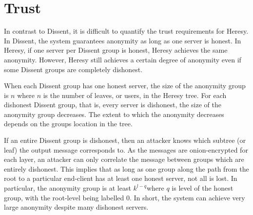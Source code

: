 \section{Trust}

In contrast to Dissent, it is difficult to quantify the trust requirements for Heresy. In Dissent, the system guarantees anonymity as long as one server is honest. In Heresy, if one server per Dissent group is honest, Heresy achieves the same anonymity. However, Heresy still achieves a certain degree of anonymity even if some Dissent groups are completely dishonest.

When each Dissent group has one honest server, the size of the anonymity group is $n$ where $n$ is the number of leaves, or users, in the Heresy tree. For each dishonest Dissent group, that is, every server is dishonest, the size of the anonymity group decreases. The extent to which the anonymity decreases depends on the groups location in the tree. 

If an entire Dissent group is dishonest, then an attacker knows which subtree (or leaf) the output message corresponds to. As the messages are onion-encrypted for each layer, an attacker can only correlate the message between groups which are entirely dishonest. This implies that as long as one group along the path from the root to a particular end-client has at least one honest server, not all is lost. In particular, the anonymity group is at least $k^{l-q}$where $q$ is level of the honest group, with the root-level being labelled 0. In short, the system can achieve very large anonymity despite many dishonest servers. 
